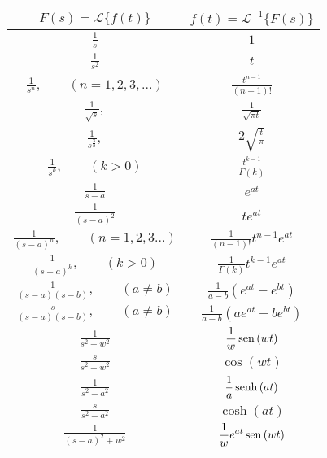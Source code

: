 \begin{table}%
\begin{small}
\begin{center}
{\renewcommand{\arraystretch}{1.9}%
\begin{tabular}{|c|c|}
\hline
 $\displaystyle F(s)=\mathcal{L }\{f(t)\} $&$\displaystyle  f(t)=\mathcal{L }^{-1}\{F(s)\}$ \\[1ex]
\hline 
 $\displaystyle \frac{1}{s} $&$\displaystyle  1$ \\[1ex] 
\hline 
 $\displaystyle \frac{1}{s^2} $&$\displaystyle  t$ \\[1ex] 
\hline 
 $\displaystyle \frac{1}{s^n}, \qquad (n=1,2,3,...) $&$\displaystyle  \frac{t^{n-1}}{(n-1)!}$ \\[1ex]
\hline 
 $\displaystyle \frac{1}{\sqrt{s}}, $&$\displaystyle  \frac{1}{\sqrt{\pi t}}$ \\[1ex] 
\hline 
 $\displaystyle \frac{1}{s^{\frac{3}{2}}}, $&$\displaystyle  2\sqrt{\frac{t}{\pi}}$ \\[1ex] 
\hline 
 $\displaystyle \frac{1}{s^{k}},\qquad (k>0)  $&$\displaystyle  \frac{t^{k-1}}{\Gamma(k)}$ \\[1ex] 
\hline 
 $\displaystyle \frac{1}{s-a} $&$\displaystyle  e^{ at}$ \\[1ex] 
\hline 
 $\displaystyle \frac{1}{(s-a)^2} $&$\displaystyle  te^{at}$ \\[1ex] 
\hline 
 $\displaystyle \frac{1}{(s-a)^n},\qquad (n=1,2,3...) $&$\displaystyle  \frac{1}{(n-1)!}t^{n-1}e^{at}$ \\[1ex] 
\hline
 $\displaystyle \frac{1}{(s-a)^k},\qquad (k>0) $&$\displaystyle  \frac{1}{\Gamma(k)}t^{k-1}e^{at}$ \\[1ex] 
\hline 
 $\displaystyle \frac{1}{(s-a)(s-b)},\qquad (a\neq b) $&$\displaystyle  \frac{1}{a-b}\left(e^{at}-e^{bt}\right)$ \\[1ex] 
\hline 
 $\displaystyle \frac{s}{(s-a)(s-b)},\qquad (a\neq b) $&$\displaystyle  \frac{1}{a-b}\left(ae^{at}-be^{bt}\right)$ \\[1ex] 
\hline 
 $\displaystyle \frac{1}{s^2+w^2} $&$\displaystyle  \frac{1}{w}\operatorname{sen}\,(wt)$ \\[1ex] 
\hline 
 $\displaystyle \frac{s}{s^2+w^2} $&$\displaystyle  \cos(wt)$ \\[1ex] 
\hline 
 $\displaystyle \frac{1}{s^2-a^2} $&$\displaystyle   \frac{1}{a}\operatorname{senh}\,(at)$ \\[1ex] 
\hline 
 $\displaystyle \frac{s}{s^2-a^2} $&$\displaystyle  \cosh(at)$ \\[1ex] 
\hline 
 $\displaystyle \frac{1}{(s-a)^2+w^2} $&$\displaystyle  \frac{1}{w}e^{at}\operatorname{sen}\,(wt)$ \\[1ex] 

\end{tabular}}
\end{center}
\end{small}
\end{table}
